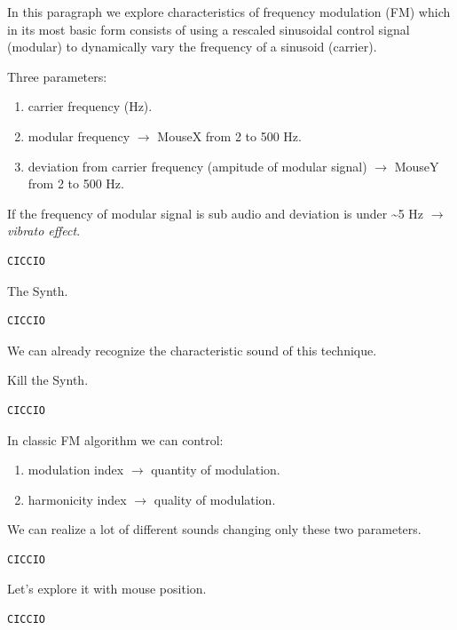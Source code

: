 In this paragraph we explore characteristics of frequency modulation (FM) which in its most basic form consists of using a rescaled sinusoidal control signal (modular) to dynamically vary the frequency of a sinusoid (carrier).

Three parameters:

\begin{enumerate}
\tightlist 
\item  carrier frequency (Hz). 
\item modular frequency \(\rightarrow\) MouseX from 2 to 500 Hz. 
\item deviation from carrier frequency (ampitude of modular signal) \(\rightarrow\) MouseY from 2 to 500 Hz.
\end{enumerate}

If the frequency of modular signal is sub audio and deviation is under \textasciitilde5 Hz \(\rightarrow\) \textit{vibrato effect}.

\begin{lstlisting}[frame=single] 
CICCIO
\end{lstlisting}

The Synth.

\begin{lstlisting}[frame=single] 
CICCIO
\end{lstlisting}

We can already recognize the characteristic sound of this technique.

Kill the Synth.

\begin{lstlisting}[frame=single] 
CICCIO
\end{lstlisting}

In classic FM algorithm we can control:

\begin{enumerate}
\tightlist 
\item modulation index \(\rightarrow\) quantity of modulation. 
\item harmonicity index \(\rightarrow\) quality of modulation.
\end{enumerate}

We can realize a lot of different sounds changing only these two parameters.

\begin{lstlisting}[frame=single] 
CICCIO
\end{lstlisting}

Let's explore it with mouse position.

\begin{lstlisting}[frame=single] 
CICCIO
\end{lstlisting}

